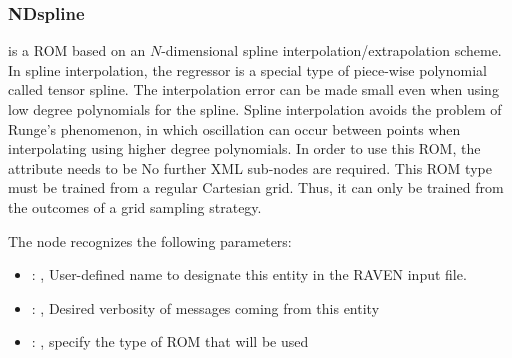 

\subsubsection{NDspline}
   is a ROM based on an $N$-dimensional                             spline
  interpolation/extrapolation scheme.                             In spline interpolation, the
  regressor is a special type of piece-wise                             polynomial called tensor
  spline.                             The interpolation error can be made small even when using low
  degree polynomials                             for the spline.                             Spline
  interpolation avoids the problem of Runge's phenomenon, in which
  oscillation can occur between points when interpolating using higher degree
  polynomials.                             In order to use this ROM, the  attribute
   needs to                             be 
  No further XML sub-nodes are required.                             \nb This ROM type must be
  trained from a regular Cartesian grid.                             Thus, it can only be trained
  from the outcomes of a grid sampling strategy.

  The  node recognizes the following parameters:
    \begin{itemize}
      \item {}: , 
        User-defined name to designate this entity in the RAVEN input file.
      \item {}: , 
        Desired verbosity of messages coming from this entity
      \item {}: , 
        specify the type of ROM that will be used
  \end{itemize}

